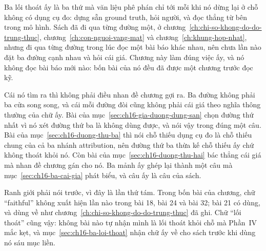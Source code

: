 %
Ba lối thoát ấy là ba thứ mà văn liệu phê phán chỉ tới mỗi khi nó dừng lại ở chỗ
không có dụng cụ đo: dựng sẵn ground truth, hỏi người, và đọc thẳng từ bên trong
mô hình. Sách đã đi qua từng đường một, ở
chương~\ref{ch:chi-so-khong-do-do-trung-thuc},
chương~\ref{ch:con-nguoi-vang-mat} và chương~\ref{ch:khung-hop-nhat}, nhưng đi
qua từng đường trong lúc đọc một bài báo khác nhau, nên chưa lần nào đặt ba
đường cạnh nhau và hỏi cái giá. Chương này làm đúng việc ấy, và nó không đọc bài
báo mới nào: bốn bài của nó đều đã được một chương trước đọc kỹ.

Cái nó tìm ra thì không phải điều nhan đề chương gợi ra. Ba đường không phải ba
cửa song song, và cái mỗi đường đòi cũng không phải cái giá theo nghĩa thông
thường của chữ ấy. Bài của mục~\ref{sec:ch16-gia-duong-dung-san} chọn đường thứ
nhất vì nó xét đường thứ ba là không dùng được, và nói vậy trong đúng một câu.
Bài của mục~\ref{sec:ch16-duong-thu-ba} thì nói chỗ thiếu dụng cụ đo là chỗ
thiếu chung của cả ba nhánh attribution, nên đường thứ ba thừa kế chỗ thiếu ấy
chứ không thoát khỏi nó. Còn bài của mục~\ref{sec:ch16-duong-thu-hai} bác thẳng
cái giá mà nhan đề chương gán cho nó. Ba mảnh ấy ghép lại thành một câu mà
mục~\ref{sec:ch16-ba-cai-gia} phát biểu, và câu ấy là câu của sách.

Ranh giới phải nói trước, vì đây là lần thứ tám. Trong bốn bài của chương, chữ
\enquote{faithful} không xuất hiện lần nào trong bài 18, bài 24 và bài 32; bài
21 có dùng, và dùng về  như
chương~\ref{ch:chi-so-khong-do-do-trung-thuc} đã ghi. Chữ \enquote{lối thoát}
cũng vậy: không bài nào tự nhận mình là lối thoát khỏi chỗ mà Phần~IV mắc kẹt,
và mục~\ref{sec:ch16-ba-loi-thoat} nhận chữ ấy về cho sách trước khi dùng nó
sáu mục liền.









